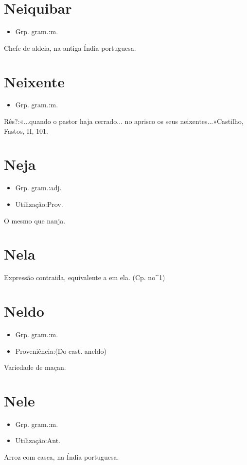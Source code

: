 \section{Neiquibar}
\begin{itemize}
\item {Grp. gram.:m.}
\end{itemize}
Chefe de aldeia, na antiga Índia portuguesa.
\section{Neixente}
\begin{itemize}
\item {Grp. gram.:m.}
\end{itemize}
Rês?:«\textunderscore ...quando o pastor haja cerrado... no aprisco os seus neixentes...\textunderscore »Castilho, \textunderscore Fastos\textunderscore , II, 101.
\section{Neja}
\begin{itemize}
\item {Grp. gram.:adj.}
\end{itemize}
\begin{itemize}
\item {Utilização:Prov.}
\end{itemize}
O mesmo que \textunderscore nanja\textunderscore .
\section{Nela}
Expressão contraida, equivalente a \textunderscore em ela\textunderscore .
(Cp. \textunderscore no\textunderscore ^1)
\section{Neldo}
\begin{itemize}
\item {Grp. gram.:m.}
\end{itemize}
\begin{itemize}
\item {Proveniência:(Do cast. \textunderscore aneldo\textunderscore )}
\end{itemize}
Variedade de maçan.
\section{Nele}
\begin{itemize}
\item {Grp. gram.:m.}
\end{itemize}
\begin{itemize}
\item {Utilização:Ant.}
\end{itemize}
Arroz com casca, na Índia portuguesa.
